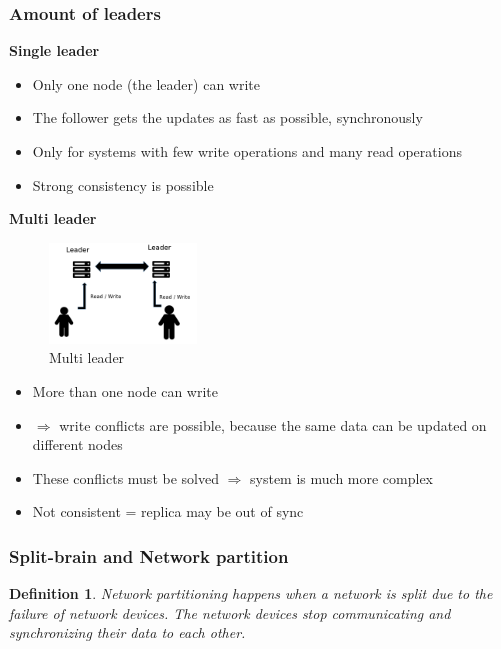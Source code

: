 \documentclass{article}
\newtheorem{theorem}{Definition}[section]
\begin{document}
\subsubsection{Amount of leaders}

\textbf{Single leader}

\begin{itemize}
    \item Only one node (the leader) can write
    \item The follower gets the updates as fast as possible, synchronously
    \item Only for systems with few write operations and many read operations
    \item Strong consistency is possible
\end{itemize}

\textbf{Multi leader}
\begin{figure}[H]
    \centering
    \includegraphics[width=0.35\textwidth]{replication-multi-leader.png}
    \caption{Multi leader}
\end{figure}

\begin{itemize}
    \item More than one node can write
    \item $\Rightarrow$ write conflicts are possible, because the same data can be updated on different nodes
    \item These conflicts must be solved $\Rightarrow$ system is much more complex
    \item Not consistent = replica may be out of sync
\end{itemize}

\subsubsection{Split-brain and Network partition}

\begin{theorem}
    Network partitioning happens when a network is split due to the failure of network devices.
    The network devices stop communicating and synchronizing their data to each other.
\end{theorem}
\end{document}
